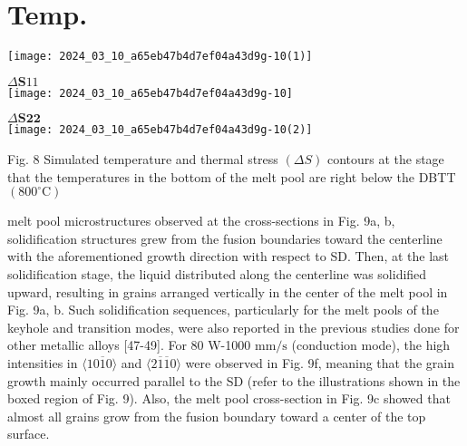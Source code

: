 \documentclass[10pt]{article}
\begin{document}
\section*{Temp.}
\begin{center}
\texttt{[image: 2024\_03\_10\_a65eb47b4d7ef04a43d9g-10(1)]}
\end{center}

$\Delta \mathbf{S} 11$\\
\texttt{[image: 2024\_03\_10\_a65eb47b4d7ef04a43d9g-10]}

$\Delta \mathbf{S 2 2}$\\
\texttt{[image: 2024\_03\_10\_a65eb47b4d7ef04a43d9g-10(2)]}

Fig. 8 Simulated temperature and thermal stress $(\Delta S)$ contours at the stage that the temperatures in the bottom of the melt pool are right below the DBTT $\left(800^{\circ} \mathrm{C}\right)$

melt pool microstructures observed at the cross-sections in Fig. 9a, b, solidification structures grew from the fusion boundaries toward the centerline with the aforementioned growth direction with respect to SD. Then, at the last solidification stage, the liquid distributed along the centerline was solidified upward, resulting in grains arranged vertically in the center of the melt pool in Fig. 9a, b. Such solidification sequences, particularly for the melt pools of the keyhole and transition modes, were also reported in the previous studies done for other metallic alloys [47-49]. For 80 W-1000 $\mathrm{mm} / \mathrm{s}$ (conduction mode), the high intensities in $\langle 10 \overline{1} 0\rangle$ and $\langle 2 \overline{1} \overline{1} 0\rangle$ were observed in Fig. 9f, meaning that the grain growth mainly occurred parallel to the SD (refer to the illustrations shown in the boxed region of Fig. 9). Also, the melt pool cross-section in Fig. 9c showed that almost all grains grow from the fusion boundary toward a center of the top surface.
\end{document}
